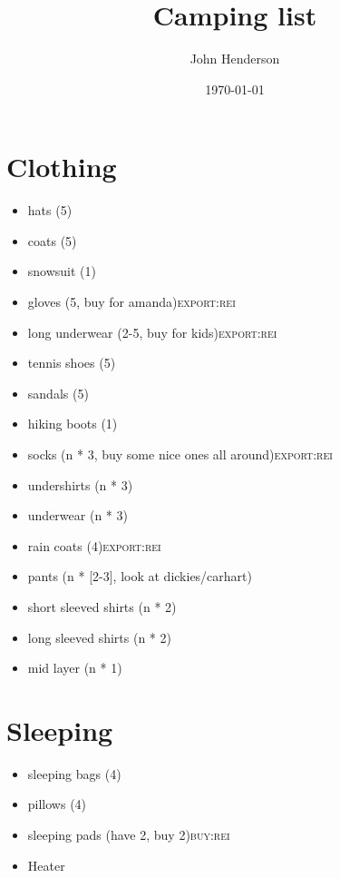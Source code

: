 \documentclass[11pt]{article}
\author{John Henderson}
\date{\today}
\title{Camping list}
\begin{document}
\maketitle
\section*{Clothing}
\label{sec-1}
\begin{itemize}
\item hats (5)
\label{sec-1-1}
\item coats (5)
\label{sec-1-2}
\item snowsuit (1)
\label{sec-1-3}
\item gloves (5, buy for amanda)\hfill{}\textsc{export:rei}
\label{sec-1-4}
\item long underwear (2-5, buy for kids)\hfill{}\textsc{export:rei}
\label{sec-1-5}
\item tennis shoes (5)
\label{sec-1-6}
\item sandals (5)
\label{sec-1-7}
\item hiking boots (1)
\label{sec-1-8}
\item socks (n * 3, buy some nice ones all around)\hfill{}\textsc{export:rei}
\label{sec-1-9}
\item undershirts (n * 3)
\label{sec-1-10}
\item underwear (n * 3)
\label{sec-1-11}
\item rain coats (4)\hfill{}\textsc{export:rei}
\label{sec-1-12}
\item pants (n * [2-3], look at dickies/carhart)
\label{sec-1-13}
\item short sleeved shirts (n * 2)
\label{sec-1-14}
\item long sleeved shirts (n * 2)
\label{sec-1-15}
\item mid layer (n * 1)
\label{sec-1-16}
\end{itemize}

\section*{Sleeping}
\label{sec-2}
\begin{itemize}
\item sleeping bags (4)
\label{sec-2-1}
\item pillows (4)
\label{sec-2-2}
\item sleeping pads (have 2, buy 2)\hfill{}\textsc{buy:rei}
\label{sec-2-3}
\item Heater
\label{sec-2-4}
\end{itemize}
\end{document}
